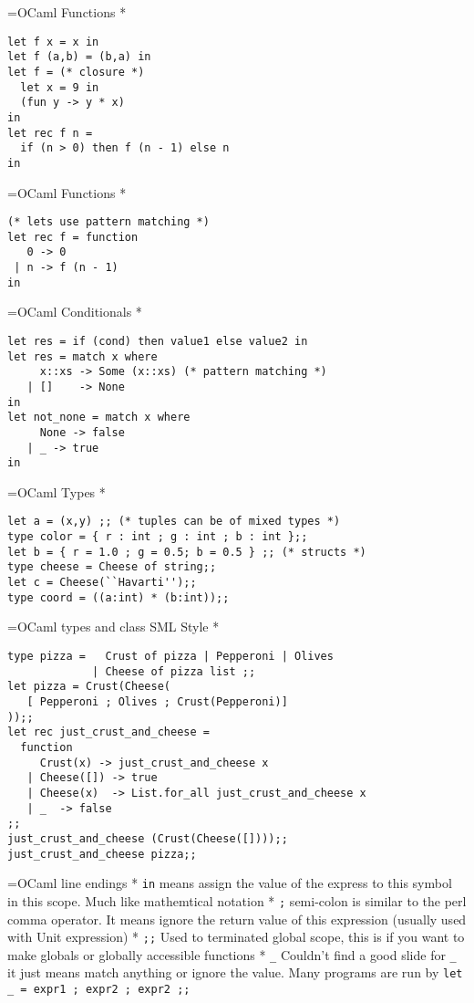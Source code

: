 \documentclass[titlepage,usenames,a4,landscape,semhelv]{seminar}
\begin{document}
\begin{slide}
=OCaml Functions
*
\begin{verbatim}
let f x = x in
let f (a,b) = (b,a) in
let f = (* closure *)
  let x = 9 in
  (fun y -> y * x)
in
let rec f n =
  if (n > 0) then f (n - 1) else n
in
\end{verbatim}
=OCaml Functions
*
\begin{verbatim}
(* lets use pattern matching *)
let rec f = function
   0 -> 0
 | n -> f (n - 1)
in

\end{verbatim}
=OCaml Conditionals
*
\begin{verbatim}
let res = if (cond) then value1 else value2 in
let res = match x where
     x::xs -> Some (x::xs) (* pattern matching *)
   | []    -> None
in
let not_none = match x where 
     None -> false
   | _ -> true
in
\end{verbatim}
=OCaml Types
*
\begin{verbatim}
let a = (x,y) ;; (* tuples can be of mixed types *)
type color = { r : int ; g : int ; b : int };;
let b = { r = 1.0 ; g = 0.5; b = 0.5 } ;; (* structs *)
type cheese = Cheese of string;; 
let c = Cheese(``Havarti'');;
type coord = ((a:int) * (b:int));;
\end{verbatim}
=OCaml types and class SML Style
*
\begin{verbatim}
type pizza =   Crust of pizza | Pepperoni | Olives 
             | Cheese of pizza list ;;
let pizza = Crust(Cheese(
   [ Pepperoni ; Olives ; Crust(Pepperoni)]
));;
let rec just_crust_and_cheese = 
  function 
     Crust(x) -> just_crust_and_cheese x
   | Cheese([]) -> true
   | Cheese(x)  -> List.for_all just_crust_and_cheese x
   | _  -> false
;;
just_crust_and_cheese (Crust(Cheese([])));;
just_crust_and_cheese pizza;;
\end{verbatim}

=OCaml line endings
* \texttt{in} means assign the value of the express to this symbol in this scope. Much like mathemtical notation
* \texttt{;} semi-colon is similar to the perl comma operator. It means ignore the return value of this expression (usually used with Unit expression)
* \texttt{;;} Used to terminated global scope, this is if you want to make globals or globally accessible functions
* \texttt{\_} Couldn't find a good slide for \texttt{\_} it just means match anything or ignore the value. Many programs are run by \texttt{let \_ = expr1 ; expr2 ; expr2 ;;}


\end{slide}
\end{document}
